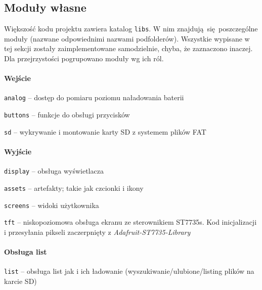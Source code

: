 \documentclass[12pt]{report}
\let\tempone\itemize
\let\temptwo\enditemize
\renewenvironment{itemize}{\tempone\setlength{\itemsep}{0cm}}{\temptwo}
\begin{document}
	\subsection{Moduły własne}
	Większość kodu projektu zawiera katalog \lstinline|libs|. W nim znajdują się poszczególne moduły (nazwane odpowiednimi nazwami podfolderów). Wszystkie wypisane w tej sekcji zostały zaimplementowane samodzielnie, chyba, że zaznaczono inaczej. Dla przejrzystości pogrupowano moduły wg ich ról.
	
	\paragraph{Wejście}
	\begin{itemize}
		\item \lstinline|analog| -- dostęp do pomiaru poziomu naładowania baterii
		\item \lstinline|buttons| -- funkcje do obsługi przycisków
		\item \lstinline|sd| -- wykrywanie i montowanie karty SD z systemem plików FAT
	\end{itemize}

	\paragraph{Wyjście}
	\begin{itemize}
		\item \lstinline|display| -- obsługa wyświetlacza
		\begin{itemize}
			\item \lstinline|assets| -- artefakty; takie jak czcionki i ikony
			\item \lstinline|screens| -- widoki użytkownika
			\item \lstinline|tft| -- niskopoziomowa obsługa ekranu ze sterownikiem ST7735s. Kod inicjalizacji i przesyłania pikseli zaczerpnięty z \textit{Adafruit-ST7735-Library}\textsuperscript{\cite{adafruit_st7735}}
		\end{itemize}
	\end{itemize}
	
	\paragraph{Obsługa list}
	\begin{itemize}
		\item \lstinline|list| -- obsługa list jak i ich ładowanie (wyszukiwanie/ulubione/listing plików na karcie SD)
	\end{itemize}
	
\end{document}
